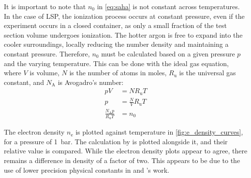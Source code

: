         It is important to note that $n_0$ in \autoref{eq:saha} is not constant across temperatures. In the case of LSP, the ionization process occurs at constant pressure, even if the experiment occurs in a closed container, as only a small fraction of the test section volume undergoes ionization. The hotter argon is free to expand into the cooler surroundings, locally reducing the number density and maintaining a constant pressure. Therefore, $n_0$ must be calculated based on a given pressure $p$ and the varying temperature. This can be done with the ideal gas equation, where $V$ is volume, $N$ is the number of atoms in moles, $R_\mathrm{u}$ is the universal gas constant, and $N_\mathrm{A}$ is Avogadro's number:
        \begin{align*}
            pV&= NR_\mathrm{u}T \\
            p&= \frac{N}{V}R_\mathrm{u}T \\
            \frac{N_\mathrm{A}p}{R_\mathrm{u}T}&= n_0
        \end{align*}

        The electron density $n_\mathrm{e}$ is plotted against temperature in \autoref{fig:e_density_curves}, for a pressure of \qty{1}{bar}. The calculation by \citeauthor{nassarInvestigationLasersustainedPlasma2012} is plotted alongside it, and their relative value is compared. While the electron density plots appear to agree, there remains a difference in density of a factor of two. This appears to be due to the use of lower precision physical constants in \citeauthor{akarapuNumericalModelLasersustained2009} and \citeauthor{nassarInvestigationLasersustainedPlasma2012}'s work.

